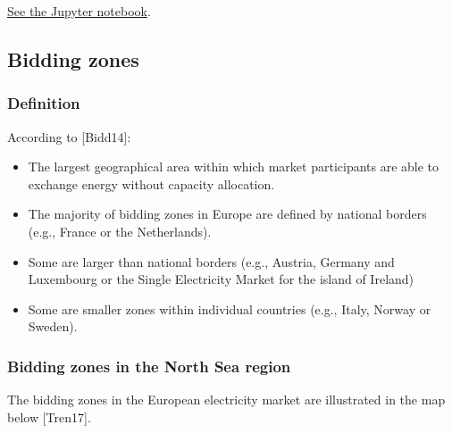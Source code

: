 \href{https://github.com/ENSYSTRA/short-term-forecasting/tree/master/jupyter-notebooks/NUTS.ipynb}{See
the Jupyter notebook}.

\hypertarget{bidding-zones}{%
\subsection{Bidding zones}\label{bidding-zones}}

\hypertarget{definition}{%
\subsubsection{Definition}\label{definition}}

According to {[}Bidd14{]}:

\begin{itemize}
\tightlist
\item
  The largest geographical area within which market participants are
  able to exchange energy without capacity allocation.
\item
  The majority of bidding zones in Europe are defined by national
  borders (e.g., France or the Netherlands).
\item
  Some are larger than national borders (e.g., Austria, Germany and
  Luxembourg or the Single Electricity Market for the island of Ireland)
\item
  Some are smaller zones within individual countries (e.g., Italy,
  Norway or Sweden).
\end{itemize}

\hypertarget{bidding-zones-in-the-north-sea-region}{%
\subsubsection{Bidding zones in the North Sea
region}\label{bidding-zones-in-the-north-sea-region}}

The bidding zones in the European electricity market are illustrated in
the map below {[}Tren17{]}.

